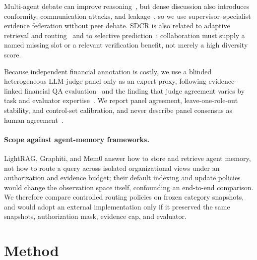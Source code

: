 \documentclass{article}
\begin{document}
Multi-agent debate can improve reasoning~\citep{du2024debate}, but dense discussion also introduces conformity, communication attacks, and leakage~\citep{choi2025conformity,he2025redteam,liu2026leakage}, so we use supervisor--specialist evidence federation without peer debate. SDCR is also related to adaptive retrieval and routing~\citep{jeong2024adaptive,asai2024selfrag,ong2025routellm} and to selective prediction~\citep{elyaniv2010selective,angelopoulos2024conformal}: collaboration must supply a named missing slot or a relevant verification benefit, not merely a high diversity score.

Because independent financial annotation is costly, we use a blinded heterogeneous LLM-judge panel only as an expert proxy, following evidence-linked financial QA evaluation~\citep{islam2023financebench} and the finding that judge agreement varies by task and evaluator expertise~\citep{bavaresco2024judgebench}. We report panel agreement, leave-one-role-out stability, and control-set calibration, and never describe panel consensus as human agreement~\citep{zhou2025jetts,kim2024prometheus2,chang2025llmjudge}.

\paragraph{Scope against agent-memory frameworks.} LightRAG, Graphiti, and Mem0 answer how to store and retrieve agent memory, not how to route a query across isolated organizational views under an authorization and evidence budget; their default indexing and update policies would change the observation space itself, confounding an end-to-end comparison. We therefore compare controlled routing policies on frozen category snapshots, and would adopt an external implementation only if it preserved the same snapshots, authorization mask, evidence cap, and evaluator.

\section{Method}
\end{document}
